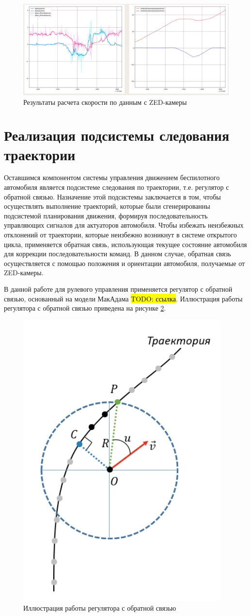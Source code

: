 \begin{figure}[h]
    \centering
    \includegraphics[width=\linewidth]{images/3_devel/zed_calc_speed}
    \caption{Результаты расчета скорости по данным с ZED-камеры}
    \label{img:zed_calc_speed}
\end{figure}

\section{Реализация подсистемы следования траектории}

Оставшимся компонентом системы управления движением беспилотного автомобиля является подсистеме следования по траектории,
т.е. регулятор с обратной связью. Назначение этой подсистемы заключается в том, чтобы осуществлять выполнение траекторий,
которые были сгенерированны подсистемой планирования движения, формируя последовательность управляющих сигналов для
актуаторов автомобиля. Чтобы избежать неизбежных отклонений от траектории, которые неизбежно возникнут в системе
открытого цикла, применяется обратная связь, использующая текущее состояние автомобиля для коррекции последовательности
команд. В данном случае, обратная связь осуществляется с помощью положения и ориентации автомобиля, получаемые от
ZED-камеры.

В данной работе для рулевого управления применяется регулятор с обратной связью, основанный на модели МакАдама
\hl{TODO: ссылка}. Иллюстрация работы регулятора с обратной связью приведена на рисунке \ref{img:path_moving}.

\begin{figure}[h]
    \centering
    \includegraphics[width=0.4\linewidth]{images/path_moving}
    \caption{Иллюстрация работы регулятора с обратной связью}
    \label{img:path_moving}
\end{figure}

